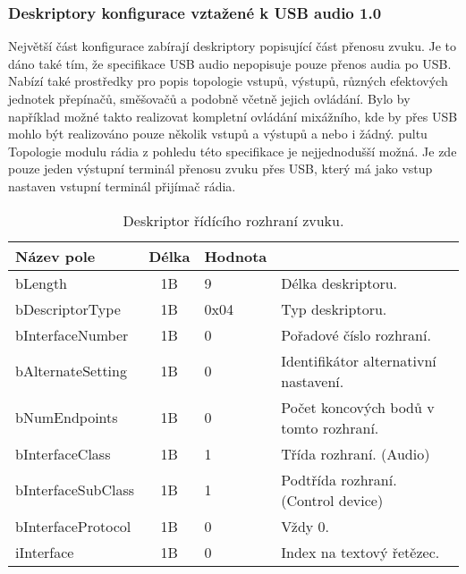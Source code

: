 \subsubsection{Deskriptory konfigurace vztažené k USB audio 1.0}
Největší část konfigurace zabírají deskriptory popisující část přenosu zvuku. Je to dáno také tím, že specifikace USB audio \cite{usb-audio} nepopisuje pouze přenos audia po USB. Nabízí také prostředky pro popis topologie vstupů, výstupů, různých efektových jednotek přepínačů, směšovačů a podobně včetně jejich ovládání. Bylo by například možné takto realizovat kompletní ovládání mixážního, kde by přes USB mohlo být realizováno pouze několik vstupů a výstupů a nebo i žádný.
pultu
Topologie modulu rádia z pohledu této specifikace je nejjednodušší možná. Je zde pouze jeden výstupní terminál přenosu zvuku přes USB, který má jako vstup nastaven vstupní terminál přijímač rádia.


\begin{table}[t]
\begin{center}
\begin{tabular}{|l|c|l|l|}
\hline 
Název pole & Délka & Hodnota &  \\ 
\hline
bLength & 1B & 9 & Délka deskriptoru.\\
\hline
bDescriptorType & 1B & 0x04 & Typ deskriptoru. \\
\hline
bInterfaceNumber & 1B & 0 & Pořadové číslo rozhraní.\\
\hline
bAlternateSetting & 1B & 0 & Identifikátor alternativní nastavení.\\
\hline
bNumEndpoints & 1B & 0 & Počet koncových bodů v tomto rozhraní.\\
\hline
bInterfaceClass & 1B & 1 & Třída rozhraní. (Audio)\\
\hline
bInterfaceSubClass & 1B & 1 & Podtřída rozhraní. (Control device)\\
\hline
bInterfaceProtocol & 1B & 0 & Vždy 0. \\
\hline
iInterface & 1B & 0 & Index na textový řetězec.\\
\hline
\end{tabular} 
\end{center}
\caption{Deskriptor řídícího rozhraní zvuku.}
\label{tab:usb-aud-ctrl} 
\end{table}

